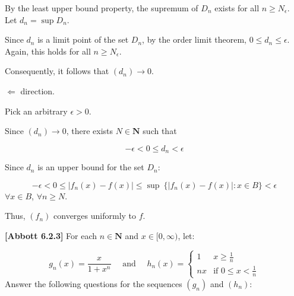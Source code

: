 \documentclass[10pt]{article}
\begin{document}
By the least upper bound property, the supremum of $\displaystyle D_{n}$ exists for all $\displaystyle n\geq N_{\epsilon }$. Let $\displaystyle d_{n} =\sup D_{n}$. 



Since $\displaystyle d_{n}$ is a limit point of the set $\displaystyle D_{n}$, by the order limit theorem, $\displaystyle 0\leq d_{n} \leq \epsilon $. Again, this holds for all $\displaystyle n\geq N_{\epsilon }$.



Consequently, it follows that $\displaystyle ( d_{n})\rightarrow 0$. 



$\displaystyle \Longleftarrow $ direction.



Pick an arbitrary $\displaystyle \epsilon  >0$. 



Since $\displaystyle ( d_{n})\rightarrow 0$, there exists $\displaystyle N\in \mathbf{N}$ such that


\begin{equation*}
-\epsilon < 0\leq d_{n} < \epsilon 
\end{equation*}


Since $\displaystyle d_{n}$ is an upper bound for the set $\displaystyle D_{n}$:


\begin{equation*}
-\epsilon < 0\leq |f_{n}( x) -f( x) |\leq \sup \ \{|f_{n}( x) -f( x) |:x\in B\} < \epsilon 
\end{equation*}
$\displaystyle \forall x\in B$, $\displaystyle \forall n\geq N$. 



Thus, $\displaystyle ( f_{n})$ converges uniformly to $\displaystyle f$.



\textbf{[Abbott 6.2.3] }For each $\displaystyle n\in \mathbf{N}$ and $\displaystyle x\in [ 0,\infty )$, let:




\begin{equation*}
g_{n}( x) =\frac{x}{1+x^{n}} \quad \text{ and } \quad h_{n}( x) =\begin{cases}
1 & x\geq \frac{1}{n}\\
nx & \text{if } 0\leq x< \frac{1}{n}
\end{cases}
\end{equation*}
Answer the following questions for the sequences $\displaystyle ( g_{n})$ and $\displaystyle ( h_{n})$:
\end{document}

